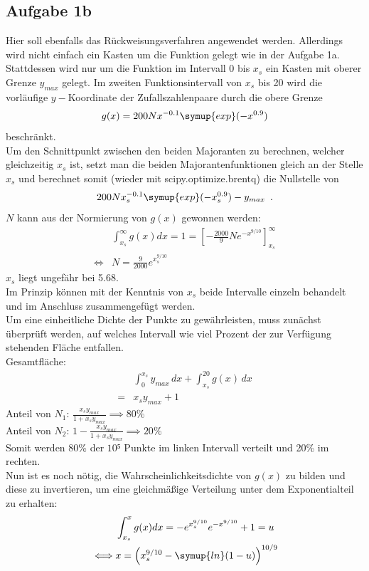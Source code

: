     \subsection{Aufgabe 1b}

      Hier soll ebenfalls das Rückweisungsverfahren angewendet werden.
      Allerdings wird nicht einfach ein Kasten um die Funktion gelegt wie in
      der Aufgabe 1a. Stattdessen wird nur um die Funktion
      im Intervall 0 bis $x_s$ ein Kasten mit oberer Grenze $y_{max}$ gelegt.
      Im zweiten Funktionsintervall von $x_s$ bis 20 wird die vorläufige
      $y-$Koordinate der Zufallszahlenpaare durch die obere Grenze
      \begin{align*}
        g(x) = 200Nx^{-0.1}\symup{exp}(-x^{0.9})
      \end{align*}
      beschränkt. \\
      Um den Schnittpunkt zwischen den beiden Majoranten zu berechnen, welcher
      gleichzeitig $x_s$ ist, setzt man die beiden Majorantenfunktionen gleich
      an der Stelle $x_s$ und berechnet somit (wieder mit scipy.optimize.brentq)
      die Nullstelle von
      \begin{align*}
        200Nx_s^{-0.1}\symup{exp}(-x_s^{0.9})-y_{max}\,\,\,.
      \end{align*}
      $N$ kann aus der Normierung von $g(x)$ gewonnen werden:
      \begin{align*}
        &\int_{x_s}^\infty g(x)dx = 1 = \left[-\frac{2000}9Ne^{-x^{9/10}}\right]_{x_s}^\infty\\
        \iff &N=\frac9{2000}e^{x_s^{9/10}}
      \end{align*}
      $x_s$ liegt ungefähr bei 5.68.\\

      Im Prinzip können mit der Kenntnis von $x_s$ beide Intervalle einzeln
      behandelt und im Anschluss zusammengefügt werden. \\
      Um eine einheitliche Dichte der Punkte zu gewährleisten,
      muss zunächst überprüft werden, auf welches Intervall wie viel Prozent
      der zur Verfügung stehenden Fläche entfallen. \\
      Gesamtfläche:
      \begin{align*}
        &\int_0^{x_s}y_{max}\,dx+\int_{x_s}^{20}g(x)\,dx\\
        =&x_sy_{max}+1
      \end{align*}
      Anteil von $N_1$: $\frac{x_sy_{max}}{1+x_sy_{max}} \implies 80\%$\\
      Anteil von $N_2$: $1-\frac{x_sy_{max}}{1+x_sy_{max}} \implies 20\%$\\
      Somit werden 80\% der $10⁵$ Punkte im linken Intervall verteilt und
      20\% im rechten.\\
      Nun ist es noch nötig, die Wahrscheinlichkeitsdichte von $g(x)$ zu bilden
      und diese zu invertieren, um eine gleichmäßige Verteilung unter dem
      Exponentialteil zu erhalten:
      \begin{align*}
        &\int_{x_s}^x g(x)dx=-e^{x_s^{9/10}}e^{-x^{9/10}}+1 = u\\
        \iff&x=\left(x_s^{9/10}-\symup{ln}(1-u)\right)^{10/9}
      \end{align*}

